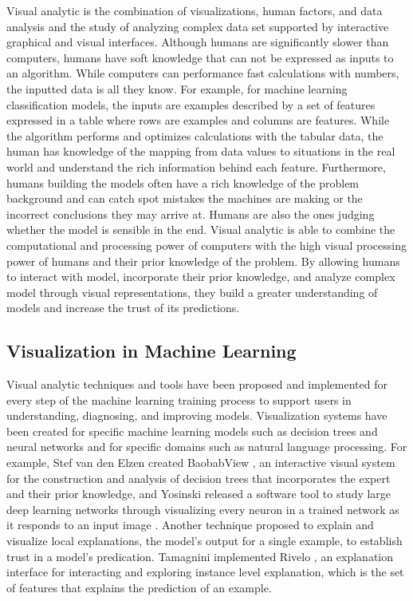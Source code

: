 \indent Visual analytic is the combination of visualizations, human factors, and data analysis and the study of analyzing complex data set supported by interactive graphical and visual interfaces.
Although humans are significantly slower than computers, humans have soft knowledge that can not be expressed as inputs to an algorithm. While computers can performance fast calculations with numbers, the inputted data is all they know. For example, for machine learning classification models, the inputs are examples described by a set of features expressed in a table where rows are examples and columns are features. While the algorithm performs and optimizes calculations with the tabular data, the human has knowledge of the mapping from data values to situations in the real world and understand the rich information behind each feature. Furthermore, humans building the models often have a rich knowledge of the problem background and can catch spot mistakes the machines are making or the incorrect conclusions they may arrive at. Humans are also the ones judging whether the model is sensible in the end. Visual analytic is able to combine the computational and processing power of computers with the high visual processing power of humans and their prior knowledge of the problem. By allowing humans to interact with model, incorporate their prior knowledge, and analyze complex model through visual representations, they build a greater understanding of models and increase the trust of its predictions. 

\subsection{Visualization in Machine Learning}
\indent Visual analytic techniques and tools have been proposed and implemented for every step of the machine learning training process to support users in understanding, diagnosing, and improving models. Visualization systems have been created for specific machine learning models such as decision trees and neural networks and for specific domains such as natural language processing. For example, Stef van den Elzen created BaobabView \cite{BaobabView}, an interactive visual system for the construction and analysis of decision trees that incorporates the expert and their prior knowledge, and Yosinski released a software tool to study large deep learning networks through visualizing every neuron in a trained network as it responds to an input image \cite{Yosinski}. Another technique proposed to explain and visualize local explanations, the model’s output for a single example, to establish trust in a model’s predication. Tamagnini implemented Rivelo \cite{Tamagnini}, an explanation interface for interacting and exploring instance level explanation, which is the set of features that explains the prediction of an example. 


